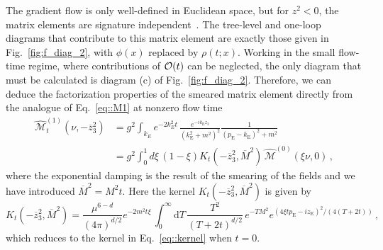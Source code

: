 The gradient flow is only well-defined in Euclidean space, but for $z^2 <0$, the
matrix elements are signature independent~\cite{Briceno:2017cpo}. The tree-level
and one-loop diagrams that contribute to this matrix element are exactly those
given in Fig.~\ref{fig:f_diag_2}, with $\phi(x)$ replaced by $\rho(t;x)$. Working in
the small flow-time regime, where contributions of ${\cal O}(t)$ can be
neglected, the only diagram that must be calculated is diagram (c) of
Fig.~\ref{fig:f_diag_2}. Therefore, we can deduce the factorization properties of the
smeared matrix element directly from the analogue of Eq.~\eqref{eq::M1} at
nonzero flow time
\begin{align}
   \label{eq::M1t}
   \widehat{\mathcal{M}}_t^{(1)}\left(\nu, -\overline{z}_3^2\right) 
   &= g^2 \int_{k_E}  e^{-2k_E^2t}\,
   \frac{e^{-i k_{\mathrm{E}}z_3}}
        {\left(k_{\mathrm{E}}^2+m^2\right)^2}
   \frac{1}{\left(p_{\mathrm{E}}-k_{\mathrm{E}}\right)^2+m^2} \nonumber \\
   &= g^2 \int_0^1 d\xi\,
        \left(1-\xi\right) K_t\left(-\overline{z}_3^2, \overline{M}^2\right)\, 
        \widehat{\mathcal{M}}^{(0)}\left(\xi\nu, 0\right)\, ,
\end{align}
where the exponential damping is the result of the smearing of the fields and we
have introduced $\overline{M}^2 = M^2 t$. Here the kernel
$K_t\left(-\overline{z}_3^2, \overline{M}^2\right)$ is given by
\begin{equation} 
        \label{eq:ktd}
        K_t\left(-\overline{z}_3^2, \overline{M}^2\right) =  
        \frac{\mu^{6-d}}{(4\pi)^{d/2}} e^{-2m^2t\xi}\, 
        \int_0^\infty \mathrm{d}T\,
                \frac{T^2}{(T+2t)^{d/2}}\, e^{-TM^2} 
                e^{(4\xi t p_{\mathrm{E}} - iz_{\mathrm{E}})^2/(4(T+2t))}\, ,
\end{equation}
which reduces to the kernel in Eq.~\eqref{eq::kernel} when $t = 0$.


